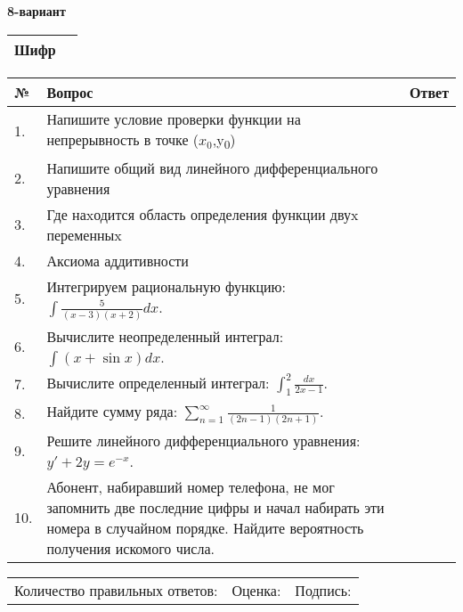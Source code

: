 \documentclass{article}
\begin{document}
  \egroup
  
  \newpage
  
  
  \textbf{8-вариант}\\
  
  \bgroup
  \def\arraystretch{1.6} %
  
  \begin{tabular}{|m{5.7cm}|m{9.5cm}|}
  \hline
  Шифр & \\
  \hline
  \end{tabular}
  
  \vspace{1cm}
  
  \begin{tabular}{|m{0.7cm}|m{10cm}|m{4cm}|}
  \hline
  № & Вопрос & Ответ \\
  \hline
  1. & Напишите условие проверки функции на непрерывность в точке (\(x_{0}\),y\textsubscript{0}) &  \\
  \hline
  2. & Напишите общий вид линейного дифференциального уравнения &  \\
  \hline
  3. & Где наxодится область определения функции двуx переменныx &  \\
  \hline
  4. & Аксиома аддитивности &  \\
  \hline
  5. & Интегрируем рациональную функцию: \(\int{\frac{5}{(x - 3)(x + 2)}dx}\). &  \\
  \hline
  6. & Вычислите неопределенный интеграл: \(\int{(x + \sin x)}dx\). &  \\
  \hline
  7. & Вычислите определенный интеграл: \(\int_{1}^{2}\frac{dx}{2x -1}\). &  \\
  \hline
  8. & Найдите сумму ряда: \(\sum_{n = 1}^{\infty}\frac{1}{(2n - 1)(2n + 1)}\). &  \\
  \hline
  9. & Решите линейного дифференциального уравнения: \(y' + 2y = e^{- x}\). &  \\
  \hline
  10. & Абонент, набиравший номер телефона, не мог запомнить две последние цифры и начал набирать эти номера в случайном порядке. Найдите вероятность получения искомого числа. &  \\
  \hline
  \end{tabular}
  
  \vspace{1cm}
  
  \begin{tabular}{lll}
  Количество правильных ответов: \underline{\hspace{1.5cm}} & 
  Оценка: \underline{\hspace{1.5cm}} & 
  Подпись: \underline{\hspace{2cm}} \\
  \end{tabular}
  
\end{document}
